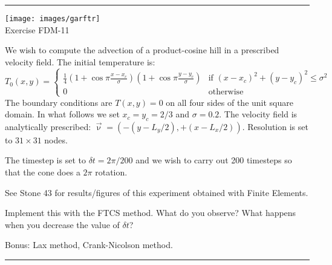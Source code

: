 \begin{center}
\begin{minipage}[t]{0.77\textwidth}
\par\noindent\rule{\textwidth}{0.4pt}
\begin{center}
\texttt{[image: images/garftr]} \\
{\color{orange} Exercise FDM-11}
\end{center}

We wish to compute the advection of a product-cosine hill
in a prescribed velocity field. The initial temperature is:
\[
T_0(x,y)=
\left\{
\begin{array}{cc}
\frac{1}{4}
\left(1+\cos \pi\frac{x-x_c}{\sigma}\right)
\left(1+\cos \pi\frac{y-y_c}{\sigma}\right)
& \text{if } (x-x_c)^2+(y-y_c)^2\leq \sigma^2 \\
0 & \text{otherwise}
\end{array} 
\right.
\]
The boundary conditions are $T(x,y)=0$ on all four sides of the unit square domain. 
In what follows we set $x_c=y_c=2/3$ and $\sigma=0.2$.  
The velocity field is analytically prescribed: $\vec\upnu=(-(y-L_y/2),+(x-L_x/2))$.
Resolution is set to $31\times31$ nodes.

The timestep is set to $\delta t=2\pi/200$ and we wish to carry out 200
timesteps so that the cone does a $2\pi$ rotation.

See Stone 43 for results/figures of this experiment obtained 
with Finite Elements.

Implement this with the FTCS method. What do you observe? What happens when you decrease 
the value of $\delta t$? 

Bonus: Lax method, Crank-Nicolson method.

\par\noindent\rule{\textwidth}{0.4pt}
\end{minipage}
\end{center}

\vspace{1cm}

